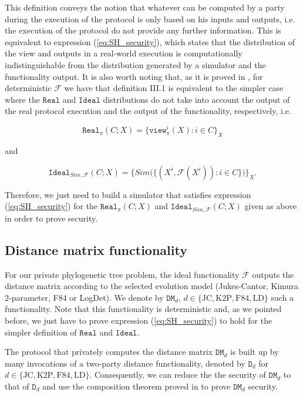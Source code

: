 This definition conveys the notion that whatever can be computed by a party during the execution of the protocol is only based on his inputs and outputs, i.e. the execution of the protocol do not provide any further information. This is equivalent to expression (\ref{eq:SH_security}), which states that the distribution of the view and outputs in a real-world execution is computationally indistinguishable from the distribution generated by a simulator and the functionality output. It is also worth noting that, as it is proved in \cite{Lindell2017}, for deterministic $\mathcal{F}$ we have that definition III.1 is equivalent to the simpler case where the $\mathtt{Real}$ and $\mathtt{Ideal}$ distributions do not take into account the output of the real protocol execution and the output of the functionality, respectively, i.e.

$$\mathtt{Real}_\pi(C; X) = \{ \mathtt{view}^i_\pi(X) : i\in C \}_X$$

and

$$\mathtt{Ideal}_{Sim, \mathcal{F}}(C; X) = \big\{ Sim\big(\{(X^i, \mathcal{F}(X^i)) : i\in C \}\big) \big\}_{X}.$$

Therefore, we just need to build a simulator that satisfies expression (\ref{eq:SH_security}) for the $\mathtt{Real}_\pi(C; X)$ and $\mathtt{Ideal}_{Sim, \mathcal{F}}(C; X)$ given as above in order to prove security.

\subsection{Distance matrix functionality}

For our private phylogenetic tree problem, the ideal functionality $\mathcal{F}$ outputs the distance matrix according to the selected evolution model (Jukes-Cantor, Kimura 2-parameter, F84 or LogDet). We denote by $\mathtt{DM}_{d},\, d\in\{\text{JC}, \text{K2P}, \text{F84}, \text{LD}\}$ such a functionality. Note that this functionality is deterministic and, as we pointed before, we just have to prove expression (\ref{eq:SH_security}) to hold for the simpler definition of $\mathtt{Real}$ and $\mathtt{Ideal}$.

The protocol that privately computes the distance matrix $\mathtt{DM}_{d}$ is built up by many invocations of a two-party distance functionality, denoted by $\mathtt{D}_d$ for $d\in\{\text{JC}, \text{K2P}, \text{F84}, \text{LD}\}$. Consequently, we can reduce the the security of $\mathtt{DM}_{d}$ to that of $\mathtt{D}_d$ and use the composition theorem proved in \cite{Goldreich98} %
to prove $\mathtt{DM}_{d}$ security. 

